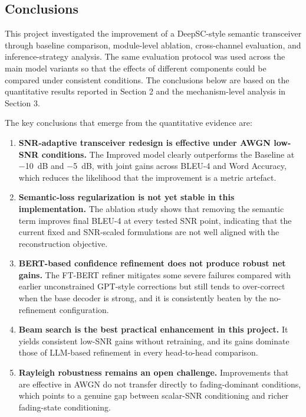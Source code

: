 \subsection{Conclusions}

This project investigated the improvement of a DeepSC-style semantic transceiver through baseline comparison, module-level ablation, cross-channel evaluation, and inference-strategy analysis. The same evaluation protocol was used across the main model variants so that the effects of different components could be compared under consistent conditions. The conclusions below are based on the quantitative results reported in Section 2 and the mechanism-level analysis in Section 3.

The key conclusions that emerge from the quantitative evidence are:
\begin{enumerate}
    \item \textbf{SNR-adaptive transceiver redesign is effective under AWGN low-SNR conditions.} The Improved model clearly outperforms the Baseline at \SI{-10}{dB} and \SI{-5}{dB}, with joint gains across BLEU-4 and Word Accuracy, which reduces the likelihood that the improvement is a metric artefact.
    \item \textbf{Semantic-loss regularization is not yet stable in this implementation.} The ablation study shows that removing the semantic term improves final BLEU-4 at every tested SNR point, indicating that the current fixed and SNR-scaled formulations are not well aligned with the reconstruction objective.
    \item \textbf{BERT-based confidence refinement does not produce robust net gains.} The FT-BERT refiner mitigates some severe failures compared with earlier unconstrained GPT-style corrections but still tends to over-correct when the base decoder is strong, and it is consistently beaten by the no-refinement configuration.
    \item \textbf{Beam search is the best practical enhancement in this project.} It yields consistent low-SNR gains without retraining, and its gains dominate those of LLM-based refinement in every head-to-head comparison.
    \item \textbf{Rayleigh robustness remains an open challenge.} Improvements that are effective in AWGN do not transfer directly to fading-dominant conditions, which points to a genuine gap between scalar-SNR conditioning and richer fading-state conditioning.
\end{enumerate}

